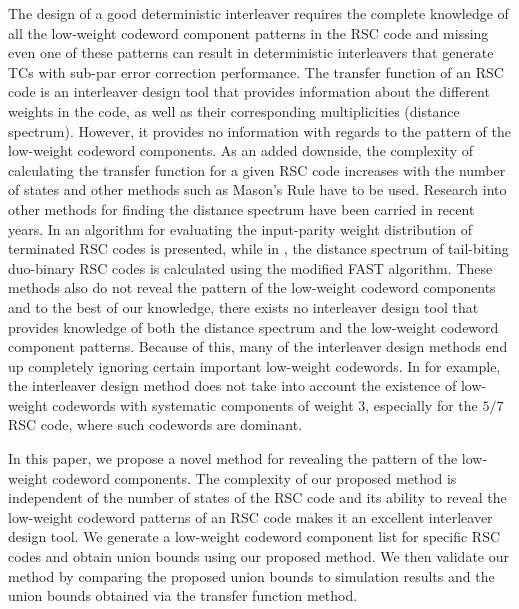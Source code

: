 The design of a good deterministic interleaver requires the complete knowledge of all the low-weight codeword component patterns in the RSC code and missing even one of these patterns can result in deterministic interleavers that generate TCs with sub-par error correction performance.
The transfer function of an RSC code is an interleaver design tool that provides information about the different weights in the code, as well as their corresponding multiplicities (distance spectrum). 
However, it provides no information with regards to the pattern of the low-weight codeword components. As an added downside, the complexity of calculating the transfer function for a given RSC code increases with the number of states and other methods such as Mason's Rule \cite{ref3} have to be used. Research into other methods for finding the distance spectrum have been carried in recent years.  In \cite{ref8} an algorithm for evaluating the input-parity weight distribution of
terminated RSC codes is presented, while in \cite{ref9}, the distance spectrum of tail-biting duo-binary
RSC codes is calculated using the modified FAST algorithm. These methods also do not reveal the pattern of the low-weight codeword components and to the best of our knowledge, there exists no interleaver design tool that provides knowledge of both the distance spectrum and the low-weight codeword component patterns. Because of this, many of the interleaver design methods end up completely ignoring certain important low-weight codewords. In \cite{ref5} for example, the interleaver design method does not take into account the existence of low-weight codewords with systematic components of weight 3, especially for the $5/7$  RSC code, where such codewords are dominant.

In this paper, we propose a novel method for revealing the pattern of the low-weight codeword components. The complexity of our proposed method is independent of the number of states of the RSC code and its ability to reveal the low-weight codeword patterns of an RSC code makes it an excellent interleaver design tool.
We generate a low-weight codeword component list for specific RSC codes and obtain union bounds using our proposed method. We then validate our method by comparing the proposed union bounds to simulation results and the union bounds obtained via the transfer function method.

